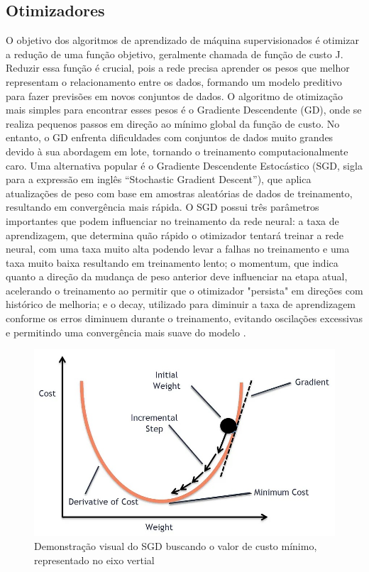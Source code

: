 \subsection{Otimizadores}
\label{sec:otimizadores}

O objetivo dos algoritmos de aprendizado de máquina supervisionados é otimizar a redução de uma função objetivo, geralmente chamada de função de custo J. Reduzir essa função é crucial, pois a rede precisa aprender os pesos que melhor representam o relacionamento entre os dados, formando um modelo preditivo para fazer previsões em novos conjuntos de dados. O algoritmo de otimização mais simples para encontrar esses pesos é o Gradiente Descendente (GD), onde se realiza pequenos passos em direção ao mínimo global da função de custo. No entanto, o GD enfrenta dificuldades com conjuntos de dados muito grandes devido à sua abordagem em lote, tornando o treinamento computacionalmente caro. Uma alternativa popular é o Gradiente Descendente Estocástico (SGD, sigla para a expressão em inglês “Stochastic Gradient Descent”), que aplica atualizações de peso com base em amostras aleatórias de dados de treinamento, resultando em convergência mais rápida. O  SGD possui três parâmetros importantes que podem influenciar no treinamento da rede neural: a taxa de aprendizagem, que determina quão rápido o otimizador tentará treinar a rede neural, com uma taxa muito alta podendo levar a falhas no treinamento e uma taxa muito baixa resultando em treinamento lento; o momentum, que indica quanto a direção da mudança de peso anterior deve influenciar na etapa atual, acelerando o treinamento ao permitir que o otimizador "persista" em direções com histórico de melhoria; e o decay, utilizado para diminuir a taxa de aprendizagem conforme os erros diminuem durante o treinamento, evitando oscilações excessivas e permitindo uma convergência mais suave do modelo \cite{silva2018estudo}.

\begin{figure}[!h]
    \center
    \begin{minipage}{0.9\linewidth}
    \center
    \captionsetup{justification=centering,margin=0.5cm,font=small}
    \includegraphics[width=0.7\linewidth]{img/cap2/sgd.jpeg}
    \caption{ Demonstração visual do SGD buscando o valor de custo mínimo, representado no eixo vertial \cite{sgdMedium}} \label{fig:sgd}
    \end{minipage}
\end{figure}

